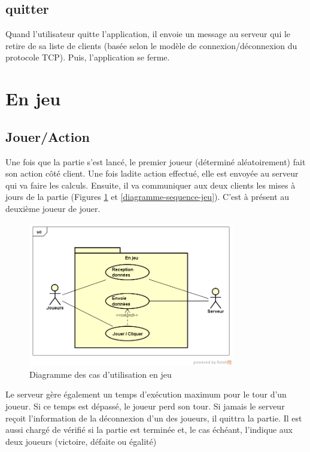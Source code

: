 \documentclass{report}
\begin{document}
\subsection{quitter}
Quand l'utilisateur quitte l'application, il envoie un message au serveur qui le retire de sa liste de clients (basée selon le modèle de connexion/déconnexion du protocole TCP).
Puis, l'application se ferme.
\section{En jeu}
\subsection{Jouer/Action}
Une fois que la partie s'est lancé, le premier joueur (déterminé aléatoirement) fait son action côté client. Une fois ladite action effectué, elle est envoyée au serveur
qui va faire les calculs. Ensuite, il va communiquer aux deux clients les mises à jours de la partie (Figures \ref{diagramme-useCase-jeu} et \ref{diagramme-sequence-jeu}).
C'est à présent au deuxième joueur de jouer. \par
\begin{figure}[ht]
	\centering\includegraphics[width=9cm]{InGame}
	\caption{Diagramme des cas d'utilisation en jeu}
	\label{diagramme-useCase-jeu}
\end{figure}
\newpage
Le serveur gère également un temps d'exécution maximum pour le tour d'un joueur. Si ce temps est dépassé, le joueur perd son tour.
Si jamais le serveur reçoit l'information de la déconnexion d'un des joueurs, il quittra la partie.
Il est aussi chargé de vérifié si la partie est terminée et, le cas échéant, l'indique aux deux joueurs (victoire, défaite ou égalité)
\end{document}
